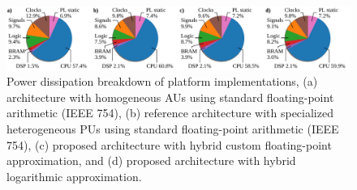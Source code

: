 \begin{figure}[b!]
	\centering
	\includegraphics[width=\columnwidth]{./chapters/sbs_accelerator/figures/platform_power_dissipation_breakdown.pdf}
	\caption{Power dissipation breakdown of platform implementations, (a) \cite{nevarez2020accelerator} architecture with homogeneous AUs using standard floating-point arithmetic (IEEE 754), (b) reference architecture with specialized heterogeneous PUs using standard floating-point arithmetic (IEEE 754), (c) proposed architecture with hybrid custom floating-point approximation, and (d) proposed architecture with hybrid logarithmic approximation.}
	\label{fig:platform_power_dissipation_breakdown}
\end{figure}